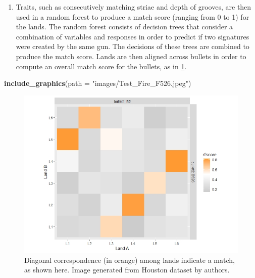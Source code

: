 \documentclass[print]{nuthesis}
\newenvironment{Shaded}{\begin{snugshade}}{\end{snugshade}}
\newcommand{\AttributeTok}[1]{\textcolor[rgb]{0.13,0.29,0.53}{#1}}
\newcommand{\FunctionTok}[1]{\textcolor[rgb]{0.13,0.29,0.53}{\textbf{#1}}}
\newcommand{\NormalTok}[1]{#1}
\newcommand{\StringTok}[1]{\textcolor[rgb]{0.31,0.60,0.02}{#1}}
\providecommand{\tightlist}{%
  \setlength{\itemsep}{0pt}\setlength{\parskip}{0pt}}
\begin{document}
\begin{enumerate}
\def\labelenumi{\arabic{enumi}.}
\setcounter{enumi}{2}
\tightlist
\item
  Traits, such as consecutively matching striae and depth of grooves, are then used in a random forest to produce a match score (ranging from 0 to 1) for the lands.
  The random forest consists of decision trees that consider a combination of variables and responses in order to predict if two signatures were created by the same gun.
  The decisions of these trees are combined to produce the match score.
  Lands are then aligned across bullets in order to compute an overall match score for the bullets, as in \ref{fig:grid}.
\end{enumerate}

\begin{Shaded}
\begin{Highlighting}[]
\FunctionTok{include\_graphics}\NormalTok{(}\AttributeTok{path =} \StringTok{"images/Test\_Fire\_F526.jpeg"}\NormalTok{)}
\end{Highlighting}
\end{Shaded}

\begin{figure}
\includegraphics[width=\linewidth]{images/Test_Fire_F526} \caption{Diagonal correspondence (in orange) among lands indicate a match, as shown here. Image generated from Houston dataset by authors.}\label{fig:grid}
\end{figure}
\end{document}
